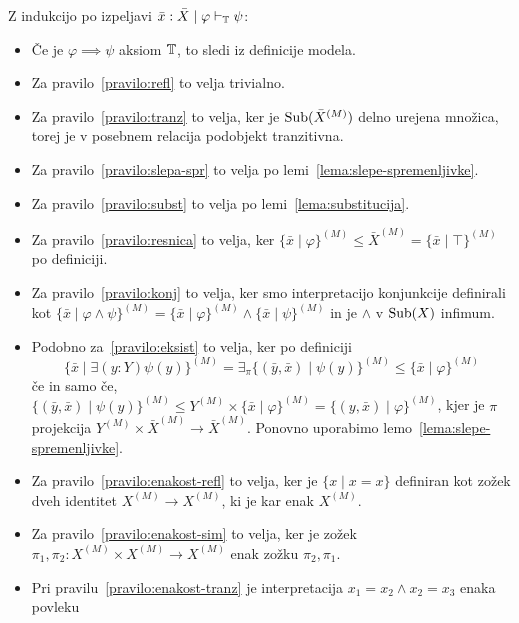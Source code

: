 \documentclass[../kategoricna_logika.tex]{subfiles}
\begin{document}
\begin{dokaz}
  Z indukcijo po izpeljavi $\bar{x}:\bar{X} \mid \varphi \vdash_{\mathbb{T}} \psi$:
  \begin{itemize}
  \item Če je $\varphi \implies \psi$ aksiom $\mathbb{T}$, to sledi iz
    definicije modela.
  \item Za pravilo~\ref{pravilo:refl} to velja trivialno.
  \item Za pravilo~\ref{pravilo:tranz} to velja, ker je
    $\operatorname{Sub}(\bar{X}^{(M)})$ delno urejena množica, torej je v posebnem
    relacija podobjekt tranzitivna.
  \item Za pravilo~\ref{pravilo:slepa-spr} to velja po lemi~\ref{lema:slepe-spremenljivke}.
  \item Za pravilo~\ref{pravilo:subst} to velja po lemi~\ref{lema:substitucija}.
  \item Za pravilo~\ref{pravilo:resnica} to velja, ker
    $\{\bar{x} \mid \varphi\}^{(M)} \leq \bar{X}^{(M)} = \{\bar{x} \mid
    \top\}^{(M)}$ po definiciji.
  \item Za pravilo~\ref{pravilo:konj} to velja, ker smo interpretacijo
    konjunkcije definirali kot
    $\{ \bar{x} \mid \varphi \land \psi\}^{(M)} = \{ \bar{x} \mid \varphi\}^{(M)}
    \land \{ \bar{x} \mid \psi\}^{(M)}$ in je $\land$ v $\operatorname{Sub}(X)$ infimum.
  \item Podobno za~\ref{pravilo:eksist} to velja, ker po definiciji
    \[ \{ \bar{x} \mid \exists (y:Y) \psi(y)\}^{(M)} =
      \exists_{\pi}\{(\bar{y}, \bar{x}) \mid \psi(y)\}^{(M)} \leq
      \{\bar{x} \mid \varphi\}^{(M)}\] če in samo če,
    $\{(\bar{y},\bar{x}) \mid \psi(y)\}^{(M)} \leq
    Y^{(M)} \times \{\bar{x} \mid \varphi\}^{(M)} =
    \{(y,\bar{x}) \mid \varphi\}^{(M)}$, kjer je
    $\pi$ projekcija $Y^{(M)} \times \bar{X}^{(M)} \to \bar{X}^{(M)}$.
    Ponovno uporabimo lemo~\ref{lema:slepe-spremenljivke}.
  \item Za pravilo~\ref{pravilo:enakost-refl} to velja, ker je
    $\{x \mid x = x\}$ definiran kot zožek dveh identitet
    $X^{(M)} \to X^{(M)}$, ki je kar enak $X^{(M)}$.
  \item Za pravilo~\ref{pravilo:enakost-sim} to velja, ker je zožek
    $\pi_1, \pi_2 : X^{(M)} \times X^{(M)} \to X^{(M)}$ enak zožku
    $\pi_2, \pi_1$.
  \item Pri pravilu~\ref{pravilo:enakost-tranz} je interpretacija
    $x_1 = x_2 \land x_2 = x_3$ enaka povleku
    \begin{equation*}
      \begin{tikzcd}

\end{tikzcd}
\end{equation*}
\end{itemize}
\end{dokaz}
\end{document}
